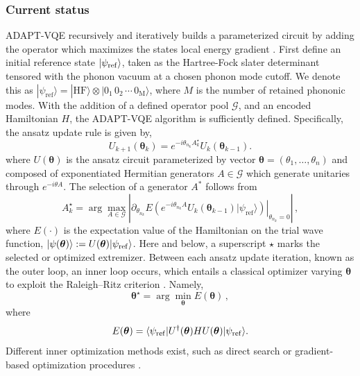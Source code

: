 \documentclass[
  reprint,
  amsmath,
  amssymb,
  aps,
  pra,
  nofootinbib,
  superscriptaddress,
  floatfix
]{revtex4-2}
\newcommand{\ket}[1]{|#1\rangle}
\newcommand{\bra}[1]{\langle #1|}
\begin{document}
\subsubsection{Current status}
ADAPT-VQE recursively and iteratively builds a parameterized circuit by adding the operator which maximizes the states local energy gradient \cite{Grimsley2019,Tang2021,Yordanov2021}. First define an initial reference state $\ket{\psi_{\rm{ref}}}$, taken as the Hartree-Fock slater determinant tensored with the phonon vacuum at a chosen phonon mode cutoff. We denote this as  \(\ket{\psi_{\mathrm{ref}}}=\ket{\mathrm{HF}}\otimes\ket{0_1\,0_2\,\cdots\,0_{\mathrm{M}}}\), where \(M\) is the number of retained phononic modes. With the addition of a defined operator pool $\mathcal G$, and an encoded Hamiltonian $H$, the ADAPT-VQE algorithm is sufficiently defined. Specifically, the ansatz update rule is given by, 
\begin{equation*}
U_{k+1}(\boldsymbol{\theta}_{k})=e^{-i\theta_{n_k} A_k^\star}U_k(\boldsymbol{\theta}_{k-1}).
\end{equation*}
where $U(\boldsymbol{\theta})$ is the ansatz circuit parameterized by vector  $\boldsymbol{\theta}=(\theta_1,\ldots,\theta_n)$ and composed of exponentiated Hermitian generators $A \in \mathcal G$ which generate unitaries through \(e^{-i\theta A}\). The selection of a generator $A^*$ follows from 
\begin{equation}
A_k^\star=\arg\max_{A\in\mathcal G}
\left|
\left.
\partial_{\theta_{n_k}}E\!\left(e^{-i\theta_{n_k} A}U_k(\boldsymbol{\theta}_{k-1})\ket{\psi_{\mathrm{ref}}}\right)
\right|_{\theta_{n_k}=0}
\right|\,,
\label{eq:adapt_append_gradient}
\end{equation}
where $E(\boldsymbol{\cdot})$ is the expectation value of the Hamiltonian on the trial wave function, $\ket{\psi(\boldsymbol{\theta})}:=U(\boldsymbol{\theta})\ket{\psi_{\rm ref}}$. Here and below, a superscript $\star$ marks the selected or optimized extremizer. Between each ansatz update iteration, known as the outer loop, an inner loop occurs, which entails a classical optimizer varying $\boldsymbol{\theta}$  to exploit the Raleigh--Ritz criterion \cite{Peruzzo2014,McClean2016,Kandala2017}. Namely, 
\begin{equation}
\label{eq:theta_opt}
\boldsymbol{\theta}^\star=\arg\min_{\boldsymbol{\theta}}E(\boldsymbol{\theta})\,,
\end{equation}
where \begin{equation}
E(\boldsymbol{\theta})=
\bra{\psi_{\rm ref}}U^\dagger(\boldsymbol{\theta})HU(\boldsymbol{\theta})\ket{\psi_{\rm ref}}.
\label{eq:rayleigh_static}
\end{equation}
Different inner optimization methods exist, such as direct search or gradient-based optimization procedures \cite{BonetMonroig2023Optimizer,Singh2023Optimizers,Gacon2021QNSPSA}. 
\end{document}
